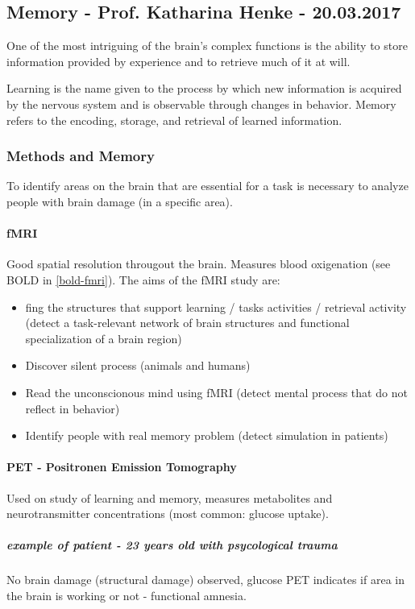 \documentclass[12pt,article,oneside,a4paper]{memoir}
\begin{document}
\subsection{Memory - Prof. Katharina Henke - 20.03.2017}
One of the most intriguing of the brain's complex functions is the ability to
store information provided by experience and to retrieve much of it at will.

Learning is the name given to the process by which new information is acquired
by the nervous system and is observable through changes in behavior.
Memory refers to the encoding, storage, and retrieval of learned information. 

\subsubsection{Methods and Memory}
To identify areas on the brain that are essential for a task is necessary to
analyze people with brain damage (in a specific area).

\paragraph{fMRI}
Good spatial resolution througout the brain. Measures blood oxigenation
(see BOLD in \ref{bold-fmri}).
The aims of the fMRI study are:
\begin{itemize}
\item fing the structures that support learning / tasks activities / retrieval
activity (detect a task-relevant network of brain structures and functional
specialization of a brain region)
\item Discover silent process (animals and humans)
\item Read the unconscionous mind using fMRI (detect mental process that do not
reflect in behavior)
\item Identify people with real memory problem (detect simulation in patients)
\end{itemize}

\paragraph{PET - Positronen Emission Tomography}
Used on study of learning and memory, measures metabolites and neurotransmitter
concentrations (most common: glucose uptake).
\subparagraph{example of patient - 23 years old with psycological trauma}
No brain damage (structural damage) observed, glucose PET indicates if area in 
the brain is working or not - functional amnesia.
\end{document}
